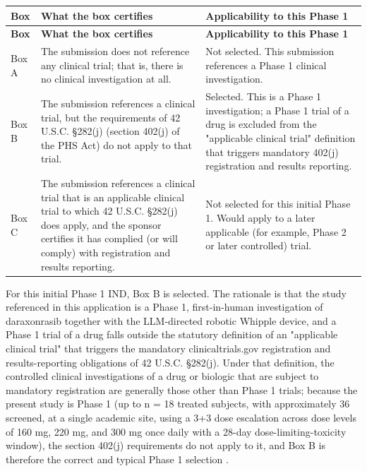 \begin{center}
\begin{xltabular}{\textwidth}{>{\raggedright\arraybackslash}p{1.6cm} Y >{\raggedright\arraybackslash}p{3.4cm}}
\toprule
\textbf{Box} & \textbf{What the box certifies} & \textbf{Applicability to this Phase 1} \\
\midrule
\endfirsthead
\toprule
\textbf{Box} & \textbf{What the box certifies} & \textbf{Applicability to this Phase 1} \\
\midrule
\endhead
\bottomrule
\endfoot
Box A & The submission does not reference any clinical trial; that is, there is no clinical investigation at all. & Not selected. This submission references a Phase 1 clinical investigation. \\
Box B & The submission references a clinical trial, but the requirements of 42 U.S.C. \S 282(j) (section 402(j) of the PHS Act) do not apply to that trial. & Selected. This is a Phase 1 investigation; a Phase 1 trial of a drug is excluded from the "applicable clinical trial" definition that triggers mandatory 402(j) registration and results reporting. \\
Box C & The submission references a clinical trial that is an applicable clinical trial to which 42 U.S.C. \S 282(j) does apply, and the sponsor certifies it has complied (or will comply) with registration and results reporting. & Not selected for this initial Phase 1. Would apply to a later applicable (for example, Phase 2 or later controlled) trial. \\
\bottomrule
\end{xltabular}
\end{center}

For this initial Phase 1 IND, Box B is selected. The rationale is that
the study referenced in this application is a Phase 1, first-in-human
investigation of daraxonrasib together with the LLM-directed robotic
Whipple device, and a Phase 1 trial of a drug falls outside the
statutory definition of an "applicable clinical trial" that triggers the
mandatory clinicaltrials.gov registration and results-reporting
obligations of 42 U.S.C. \S 282(j). Under that definition, the
controlled clinical investigations of a drug or biologic that are subject
to mandatory registration are generally those other than Phase 1 trials;
because the present study is Phase 1 (up to n = 18 treated subjects, with
approximately 36 screened, at a single academic site, using a 3+3 dose
escalation across dose levels of 160 mg, 220 mg, and 300 mg once daily
with a 28-day dose-limiting-toxicity window), the section 402(j)
requirements do not apply to it, and Box B is therefore the correct and
typical Phase 1 selection \cite{phase1guidance, oncotrialllm}.

